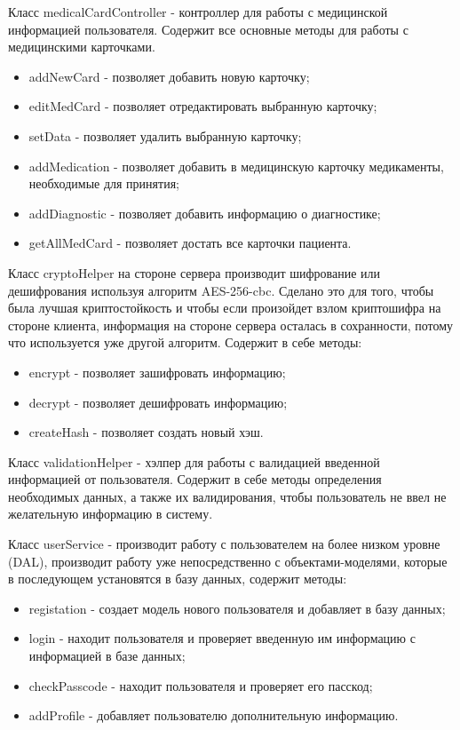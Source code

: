 Класс medicalCardController - контроллер для работы с медицинской информацией пользователя. Содержит все основные методы для работы с медицинскими карточками.

\begin{itemize}
  \item addNewCard - позволяет добавить новую карточку;
  \item editMedCard - позволяет отредактировать выбранную карточку;
  \item setData - позволяет удалить выбранную карточку;
  \item addMedication - позволяет добавить в медицинскую карточку медикаменты, необходимые для принятия;
  \item addDiagnostic - позволяет добавить информацию о диагностике;
  \item getAllMedCard - позволяет достать все карточки пациента.
\end{itemize}

Класс cryptoHelper на стороне сервера производит шифрование или дешифрования используя алгоритм AES-256-cbc. Сделано это для того, чтобы была лучшая криптостойкость и чтобы если произойдет взлом криптошифра на стороне клиента, информация на стороне сервера осталась в сохранности, потому что используется уже другой алгоритм. Содержит в себе методы:
\begin{itemize}
  \item encrypt - позволяет зашифровать информацию;
  \item decrypt - позволяет дешифровать информацию;
  \item createHash - позволяет создать новый хэш.
\end{itemize}

Класс validationHelper - хэлпер для работы с валидацией введенной информацией от пользователя. Содержит в себе методы определения необходимых данных, а также их валидирования, чтобы пользователь не ввел не желательную информацию в систему.

Класс userService - производит работу с пользователем на более низком уровне (DAL), производит работу уже непосредственно с объектами-моделями, которые в последующем установятся в базу данных, содержит методы:
\begin{itemize}
  \item registation - создает модель нового пользователя и добавляет в базу данных;
  \item login - находит пользователя и проверяет введенную им информацию с информацией в базе данных;
  \item checkPasscode - находит пользователя и проверяет его пасскод;
  \item addProfile - добавляет пользователю дополнительную информацию.
\end{itemize}

